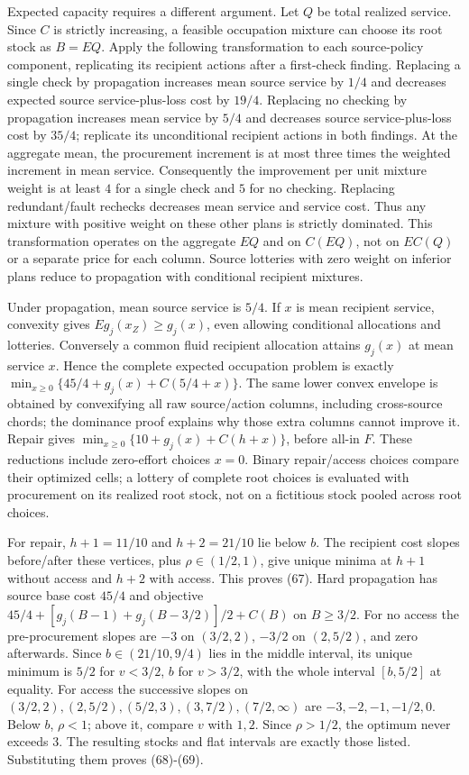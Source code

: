 \documentclass[
  11pt,
  a4paper,
]{article}
\begin{document}
Expected capacity requires a different argument. Let \(Q\) be total
realized service. Since \(C\) is strictly increasing, a feasible
occupation mixture can choose its root stock as \(B=E Q\). Apply the
following transformation to each source-policy component, replicating
its recipient actions after a first-check finding. Replacing a single
check by propagation increases mean source service by \(1/4\) and
decreases expected source service-plus-loss cost by \(19/4\). Replacing
no checking by propagation increases mean service by \(5/4\) and
decreases source service-plus-loss cost by \(35/4\); replicate its
unconditional recipient actions in both findings. At the aggregate mean,
the procurement increment is at most three times the weighted increment
in mean service. Consequently the improvement per unit mixture weight is
at least \(4\) for a single check and \(5\) for no checking. Replacing
redundant/fault rechecks decreases mean service and service cost. Thus
any mixture with positive weight on these other plans is strictly
dominated. This transformation operates on the aggregate \(E Q\) and on
\(C(E Q)\), not on \(E C(Q)\) or a separate price for each column.
Source lotteries with zero weight on inferior plans reduce to
propagation with conditional recipient mixtures.

Under propagation, mean source service is \(5/4\). If \(x\) is mean
recipient service, convexity gives \(E g_j(x_Z)\geq g_j(x)\), even
allowing conditional allocations and lotteries. Conversely a common
fluid recipient allocation attains \(g_j(x)\) at mean service \(x\).
Hence the complete expected occupation problem is exactly
\(\min_{x\geq0}\{45/4+g_j(x)+C(5/4+x)\}\). The same lower convex
envelope is obtained by convexifying all raw source/action columns,
including cross-source chords; the dominance proof explains why those
extra columns cannot improve it. Repair gives
\(\min_{x\geq0}\{10+g_j(x)+C(h+x)\}\), before all-in \(F\). These
reductions include zero-effort choices \(x=0\). Binary repair/access
choices compare their optimized cells; a lottery of complete root
choices is evaluated with procurement on its realized root stock, not on
a fictitious stock pooled across root choices.

For repair, \(h+1=11/10\) and \(h+2=21/10\) lie below \(b\). The
recipient cost slopes before/after these vertices, plus
\(\rho\in(1/2,1)\), give unique minima at \(h+1\) without access and
\(h+2\) with access. This proves (67). Hard propagation has source base
cost \(45/4\) and objective \(45/4+[g_j(B-1)+g_j(B-3/2)]/2+C(B)\) on
\(B\geq3/2\). For no access the pre-procurement slopes are \(-3\) on
\((3/2,2)\), \(-3/2\) on \((2,5/2)\), and zero afterwards. Since
\(b\in(21/10,9/4)\) lies in the middle interval, its unique minimum is
\(5/2\) for \(v<3/2\), \(b\) for \(v>3/2\), with the whole interval
\([b,5/2]\) at equality. For access the successive slopes on
\((3/2,2),(2,5/2),(5/2,3),(3,7/2),(7/2,\infty)\) are
\(-3,-2,-1,-1/2,0\). Below \(b\), \(\rho<1\); above it, compare \(v\)
with \(1,2\). Since \(\rho>1/2\), the optimum never exceeds 3. The
resulting stocks and flat intervals are exactly those listed.
Substituting them proves (68)-(69).
\end{document}
